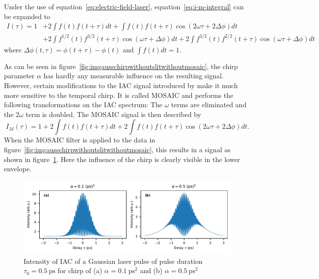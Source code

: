 Under the use of equation~\ref{eq:electric-field-laser}, equation~\eqref{eq:i-m-integral} can be expanded to
\begin{align}
I(\tau) = 1 &+ 2 \int f(t) f(t + \tau) dt + \int f(t) f(t + \tau) \cos(2 \omega \tau + 2 \Delta \phi) dt \nonumber\\
&+ 2 \int f^{1/2}(t) f^{3/2}(t + \tau) \cos(\omega \tau + \Delta \phi) dt + 2 \int f^{3/2}(t) f^{2/2}(t + \tau) \cos(\omega \tau + \Delta \phi) dt
\end{align}
where $\Delta \phi(t, \tau) = \phi(t + \tau) - \phi(t)$ and $\int f(t) dt = 1$.

As can be seen in figure~\ref{fig:imgausschirpwithoutslitwithoutmosaic}, the chirp parameter $\alpha$ has hardly any measurable influence on the resulting signal.
However, certain modifications to the \ac{IAC} signal introduced by \textcite{hirayama_real-time_2002} make it much more sensitive to the temporal chirp.
It is called \ac{MOSAIC} and performs the following transformations on the \ac{IAC} spectrum: The $\omega$ terms are eliminated and the $2\omega$ term is doubled.
The \ac{MOSAIC} signal is then described by
\begin{equation}
\label{eq:i-m-filtered}
I_{M}(\tau) = 1 + 2 \int f(t) f(t + \tau) dt + 2 \int f(t) f(t + \tau) \cos(2\omega \tau + 2\Delta \phi) dt.
\end{equation}
When the MOSAIC filter is applied to the data in figure~\ref{fig:imgausschirpwithoutslitwithoutmosaic}, this results in a signal as shown in figure~\ref{fig:mosaicchirpedlaserpulse}.
Here the influence of the chirp is clearly visible in the lower envelope.
\begin{figure}[H]
	\centering
	\includegraphics[width=\linewidth]{figures/chirp/plots/mosaic_chirped_laser_pulse}
	\caption{Intensity of IAC of a Gaussian laser pulse of pulse duration $\tau_0=\SI{0.5}{\pico \second}$ for chirp of (a) $\alpha = \SI{0.1}{\pico \second \squared}$ and (b) $\alpha = \SI{0.5}{\pico \second \squared}$}
	\label{fig:mosaicchirpedlaserpulse}
\end{figure}

